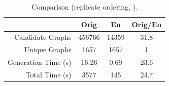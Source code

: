 \begin{table}[!ht]
\centering
\caption{Comparison (replicate ordering, ).\label{tb:app1:ordering-ex2}}
\begin{tabular}{r | c | c | c}
\hline \hline
& Orig & En & Orig/En \\
\hline
Candidate Graphs & 456766 & 14359 & 31.8 \\
Unique Graphs & 1657 & 1657 & 1 \\
Generation Time (s) & 16.26 & 0.69 & 23.6 \\
Total Time (s) & 3577 & 145 & 24.7 \\
\hline \hline
\end{tabular}
\end{table}